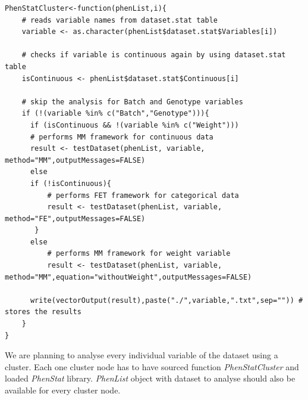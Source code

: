 \documentclass[12pt,a4paper]{article}
\begin{document}
\begingroup
\fontsize{8pt}{12pt}\selectfont
\begin{verbatim}
PhenStatCluster<-function(phenList,i){
    # reads variable names from dataset.stat table
    variable <- as.character(phenList$dataset.stat$Variables[i]) 
    
    # checks if variable is continuous again by using dataset.stat table
    isContinuous <- phenList$dataset.stat$Continuous[i]	
    
    # skip the analysis for Batch and Genotype variables
    if (!(variable %in% c("Batch","Genotype"))){	
      if (isContinuous && !(variable %in% c("Weight"))) 
	  # performs MM framework for continuous data
	  result <- testDataset(phenList, variable, method="MM",outputMessages=FALSE)	 
      else
	  if (!isContinuous){
	      # performs FET framework for categorical data
	      result <- testDataset(phenList, variable, method="FE",outputMessages=FALSE)	
	   }
	  else
	      # performs MM framework for weight variable
	      result <- testDataset(phenList, variable, method="MM",equation="withoutWeight",outputMessages=FALSE) 
	      
      write(vectorOutput(result),paste("./",variable,".txt",sep="")) # stores the results
    }
}
\end{verbatim}
\endgroup

We are planning to analyse every individual variable of the dataset using a cluster. Each one cluster node has to have sourced function \textit{PhenStatCluster} and loaded \textit{PhenStat} library. 
\textit{PhenList} object with dataset to analyse should also be available for every cluster node.
\end{document}
